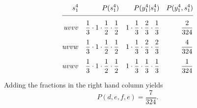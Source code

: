 \documentclass[]{article}
\newcommand{\ts}[3]{#1_{#2}^{#3}}                    %
\begin{document}
\begin{subequations}\label{eq:pcalc}
 \begin{align}
  \ts{s}{1}{4} & & P(\ts{s}{1}{4}) %
                & & P(\ts{y}{1}{4}|\ts{s}{1}{4}) %
                 & & P(\ts{y}{1}{4},\ts{s}{1}{4})\nonumber\\[1ex]
  \hline\nonumber\\[-2ex]
  uvvv         & & \frac{1}{3} \cdot 1 \cdot \frac{1}{2} \cdot \frac{1}{2} %
                & & 1 \cdot \frac{1}{3} \cdot \frac{2}{3} \cdot \frac{1}{3} %
                 & & \frac{2}{324}\\[1ex]
  uvvw         & & \frac{1}{3} \cdot 1 \cdot \frac{1}{2} \cdot \frac{1}{2} %
                & & 1 \cdot \frac{1}{3} \cdot \frac{2}{3} \cdot \frac{2}{3} %
                 & & \frac{4}{324}\\[1ex]
  uvwv         & & \frac{1}{3} \cdot 1 \cdot \frac{1}{2} \cdot \frac{1}{2} %
                & & 1 \cdot \frac{1}{3} \cdot \frac{1}{3} \cdot \frac{1}{3} %
                 & & \frac{1}{324}
 \end{align}
\end{subequations}

Adding the fractions in the right hand column yields %
\begin{equation*}
  P(d,e,f,e) = \frac{7}{324}.
\end{equation*}
\end{document}
